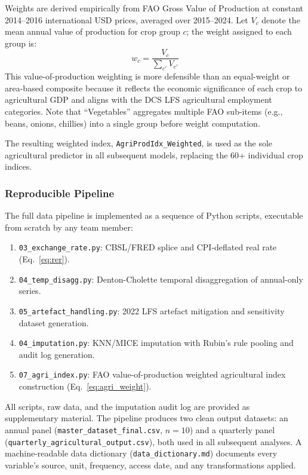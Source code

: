\documentclass[sigconf]{acmart}
\begin{document}
Weights are derived empirically from FAO Gross Value of Production
at constant 2014--2016 international USD prices, averaged over
2015--2024. Let $V_c$ denote the mean annual value of production for
crop group $c$; the weight assigned to each group is:
%
\begin{equation}
  w_c = \frac{V_c}{\sum_{c'} V_{c'}}
  \label{eq:agri_weight}
\end{equation}
%
This value-of-production weighting is more defensible than an
equal-weight or area-based composite because it reflects the
economic significance of each crop to agricultural GDP and aligns
with the DCS LFS agricultural employment categories. Note that
``Vegetables'' aggregates multiple FAO sub-items (e.g., beans,
onions, chillies) into a single group before weight computation.

The resulting weighted index, \texttt{AgriProdIdx\_Weighted}, is
used as the sole agricultural predictor in all subsequent models,
replacing the 60+ individual crop indices.

\subsubsection{Reproducible Pipeline}

The full data pipeline is implemented as a sequence of Python
scripts, executable from scratch by any team member:

\begin{enumerate}[leftmargin=*, nosep]
  \item \texttt{03\_exchange\_rate.py}: CBSL/FRED splice and
    CPI-deflated real rate (Eq.~\ref{eq:rer}).
  \item \texttt{04\_temp\_disagg.py}: Denton-Cholette temporal
    disaggregation of annual-only series.
  \item \texttt{05\_artefact\_handling.py}: 2022 LFS artefact
    mitigation and sensitivity dataset generation.
  \item \texttt{04\_imputation.py}: KNN/MICE imputation with
    Rubin's rule pooling and audit log generation.
  \item \texttt{07\_agri\_index.py}: FAO value-of-production
    weighted agricultural index construction
    (Eq.~\ref{eq:agri_weight}).
\end{enumerate}

All scripts, raw data, and the imputation audit log are provided
as supplementary material. The pipeline produces two clean output
datasets: an annual panel (\texttt{master\_dataset\_final.csv},
$n{=}10$) and a quarterly panel
(\texttt{quarterly\_agricultural\_output.csv}), both used in all
subsequent analyses. A machine-readable data dictionary
(\texttt{data\_dictionary.md}) documents every variable's source,
unit, frequency, access date, and any transformations applied.
\end{document}
